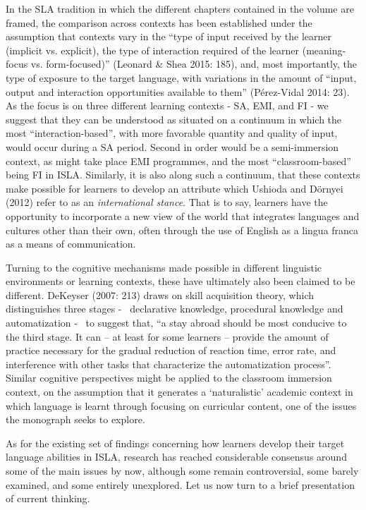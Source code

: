 \begin{styleStandard}
In the SLA tradition in which the different chapters contained in the volume are framed, the comparison across contexts has been established under the assumption that contexts vary in the “type of input received by the learner (implicit vs. explicit), the type of interaction required of the learner (meaning-focus vs. form-focused)” (Leonard \& Shea 2015: 185), and, most importantly, the type of exposure to the target language, with variations in the amount of “input, output and interaction opportunities available to them” (Pérez-Vidal 2014: 23). As the focus is on three different learning contexts - SA, EMI, and FI - we suggest that they can be understood as situated on a continuum in which the most “interaction-based”, with more favorable quantity and quality of input, would occur during a SA period. Second in order would be a semi-immersion context, as might take place EMI programmes, and the most “classroom-based” being FI in ISLA. Similarly, it is also along such a continuum, that these contexts make possible for learners to develop an attribute which Ushioda and Dörnyei (2012) refer to as an \textit{international stance}. That is to say, learners have the opportunity to incorporate a new view of the world that integrates languages and cultures other than their own, often through the use of English as a lingua franca as a means of communication.
\end{styleStandard}

\begin{styleStandard}
Turning to the cognitive mechanisms made possible in different linguistic environments or learning contexts, these have ultimately also been claimed to be different. DeKeyser (2007: 213) draws on skill acquisition theory, which distinguishes three stages - \ declarative knowledge, procedural knowledge and automatization - \ to suggest that, “a stay abroad should be most conducive to the third stage. It can – at least for some learners – provide the amount of practice necessary for the gradual reduction of reaction time, error rate, and interference with other tasks that characterize the automatization process”. Similar cognitive perspectives might be applied to the classroom immersion context, on the assumption that it generates a ‘naturalistic’ academic context in which language is learnt through focusing on curricular content, one of the issues the monograph seeks to explore. 
\end{styleStandard}

\begin{styleStandard}
As for the existing set of findings concerning how learners develop their target language abilities in ISLA, research has reached considerable consensus around some of the main issues by now, although some remain controversial, some barely examined, and some entirely unexplored. Let us now turn to a brief presentation of current thinking. \ 
\end{styleStandard}


